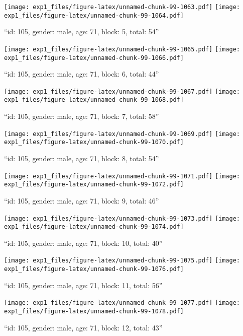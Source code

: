 \documentclass[,]{article}
\begin{document}
\texttt{[image: exp1\_files/figure-latex/unnamed-chunk-99-1063.pdf]}
\texttt{[image: exp1\_files/figure-latex/unnamed-chunk-99-1064.pdf]}

\newpage
[1] 

``id: 105, gender: male, age: 71, block: 5, total: 54''

\texttt{[image: exp1\_files/figure-latex/unnamed-chunk-99-1065.pdf]}
\texttt{[image: exp1\_files/figure-latex/unnamed-chunk-99-1066.pdf]}

\newpage
[1] 

``id: 105, gender: male, age: 71, block: 6, total: 44''

\texttt{[image: exp1\_files/figure-latex/unnamed-chunk-99-1067.pdf]}
\texttt{[image: exp1\_files/figure-latex/unnamed-chunk-99-1068.pdf]}

\newpage
[1] 

``id: 105, gender: male, age: 71, block: 7, total: 58''

\texttt{[image: exp1\_files/figure-latex/unnamed-chunk-99-1069.pdf]}
\texttt{[image: exp1\_files/figure-latex/unnamed-chunk-99-1070.pdf]}

\newpage
[1] 

``id: 105, gender: male, age: 71, block: 8, total: 54''

\texttt{[image: exp1\_files/figure-latex/unnamed-chunk-99-1071.pdf]}
\texttt{[image: exp1\_files/figure-latex/unnamed-chunk-99-1072.pdf]}

\newpage
[1] 

``id: 105, gender: male, age: 71, block: 9, total: 46''

\texttt{[image: exp1\_files/figure-latex/unnamed-chunk-99-1073.pdf]}
\texttt{[image: exp1\_files/figure-latex/unnamed-chunk-99-1074.pdf]}

\newpage
[1] 

``id: 105, gender: male, age: 71, block: 10, total: 40''

\texttt{[image: exp1\_files/figure-latex/unnamed-chunk-99-1075.pdf]}
\texttt{[image: exp1\_files/figure-latex/unnamed-chunk-99-1076.pdf]}

\newpage
[1] 

``id: 105, gender: male, age: 71, block: 11, total: 56''

\texttt{[image: exp1\_files/figure-latex/unnamed-chunk-99-1077.pdf]}
\texttt{[image: exp1\_files/figure-latex/unnamed-chunk-99-1078.pdf]}

\newpage
[1] 

``id: 105, gender: male, age: 71, block: 12, total: 43''
\end{document}
